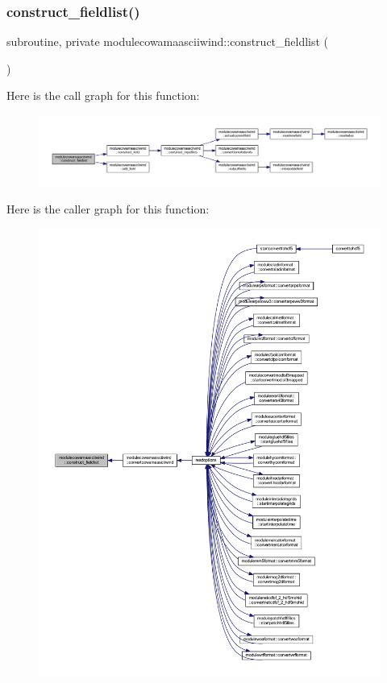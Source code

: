 \subsubsection{\texorpdfstring{construct\+\_\+fieldlist()}{construct\_fieldlist()}}
{\footnotesize\ttfamily subroutine, private modulecowamaasciiwind\+::construct\+\_\+fieldlist (\begin{DoxyParamCaption}{ }\end{DoxyParamCaption})\hspace{0.3cm}{\ttfamily [private]}}

Here is the call graph for this function\+:\nopagebreak
\begin{figure}[H]
\begin{center}
\leavevmode
\includegraphics[width=350pt]{namespacemodulecowamaasciiwind_a473204a88af20d0403e8a3f6d6230232_cgraph}
\end{center}
\end{figure}
Here is the caller graph for this function\+:\nopagebreak
\begin{figure}[H]
\begin{center}
\leavevmode
\includegraphics[width=350pt]{namespacemodulecowamaasciiwind_a473204a88af20d0403e8a3f6d6230232_icgraph}
\end{center}
\end{figure}
